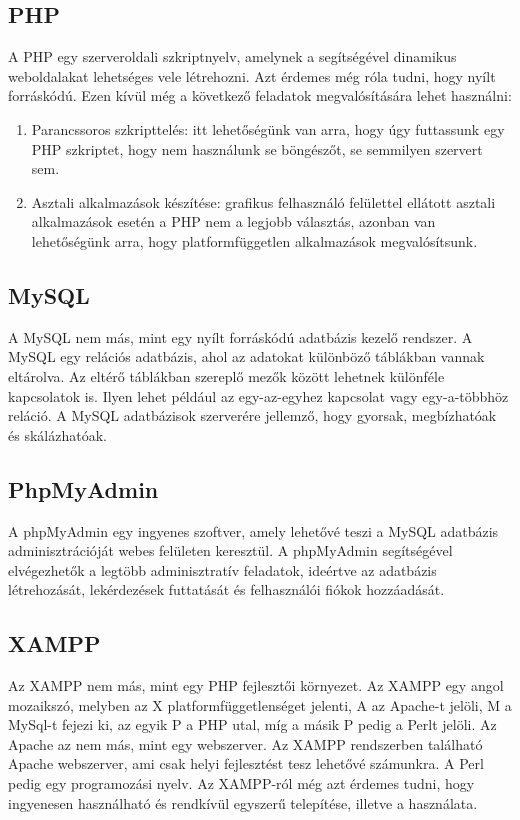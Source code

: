 \documentclass[]{thesis-ekf}
\theoremstyle{definition}
\theoremstyle{remark}
\begin{document}
	\subsection{PHP}
		A PHP egy szerveroldali szkriptnyelv, amelynek a segítségével dinamikus weboldalakat lehetséges vele létrehozni. Azt érdemes még róla tudni, hogy nyílt forráskódú. Ezen kívül még a következő feladatok megvalósítására lehet használni:
		\begin{enumerate}
			\item Parancssoros szkripttelés: itt lehetőségünk van arra, hogy úgy futtassunk egy PHP szkriptet, hogy nem használunk se böngészőt, se semmilyen szervert sem.
			\item Asztali alkalmazások készítése: grafikus felhasználó felülettel ellátott asztali alkalmazások esetén a PHP nem a legjobb választás, azonban van lehetőségünk arra, hogy platformfüggetlen alkalmazások megvalósítsunk.
		\end{enumerate}
		\cite{PHP}
	\subsection{MySQL}
		A MySQL nem más, mint egy nyílt forráskódú adatbázis kezelő rendszer. A MySQL egy relációs adatbázis, ahol az adatokat különböző táblákban vannak eltárolva. Az eltérő táblákban szereplő mezők között lehetnek különféle kapcsolatok is. Ilyen lehet például az egy-az-egyhez kapcsolat vagy egy-a-többhöz reláció. A MySQL adatbázisok szerverére jellemző, hogy gyorsak, megbízhatóak és skálázhatóak.
		\cite{MySQL}
	\subsection{PhpMyAdmin}
		A phpMyAdmin egy ingyenes szoftver, amely lehetővé teszi a MySQL adatbázis adminisztrációját webes felületen keresztül. A phpMyAdmin segítségével elvégezhetők a legtöbb adminisztratív feladatok, ideértve az adatbázis létrehozását, lekérdezések futtatását és felhasználói fiókok hozzáadását. \cite{PhpMyAdmin}
	\subsection{XAMPP}
		Az XAMPP nem más, mint egy PHP fejlesztői környezet. Az XAMPP egy angol mozaikszó, melyben az X platformfüggetlenséget jelenti, A az Apache-t jelöli, M a MySql-t fejezi ki, az egyik P a PHP utal, míg a másik P pedig a Perlt jelöli. Az Apache az nem más, mint egy webszerver. Az XAMPP rendszerben található Apache webszerver, ami csak helyi fejlesztést tesz lehetővé számunkra. A Perl pedig egy programozási nyelv. Az XAMPP-ról még azt érdemes tudni, hogy ingyenesen használható és rendkívül egyszerű telepítése, illetve a használata. \cite{XAMPP}
\end{document}
